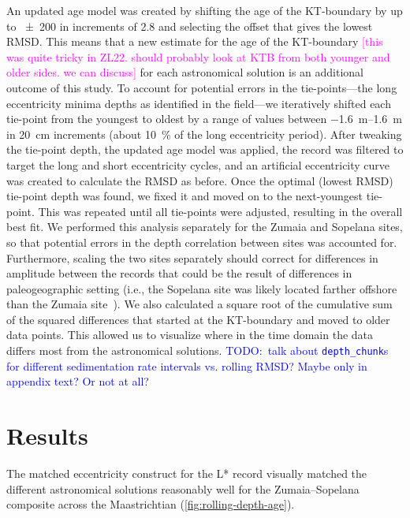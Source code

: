 \documentclass[draft]{agujournal2019}
\newcommand{\rez}{\textcolor{magenta}}
\newcommand{\ijk}{\textcolor{blue}}
\begin{document}
An updated age model was created by shifting the age of the \gls{KT}-boundary
by up to \qty{\pm200}{\kiloyear} in increments of \qty{2.8}{\kiloyear}
and selecting the offset that gives the lowest \gls{RMSD}.
This means that a new estimate for the age of the \gls{KT}-boundary
\rez{[this was quite tricky in ZL22. should probably look
at KTB from both younger and older sides. we can discuss]}
for each astronomical solution is an additional outcome of this study.
To account for potential errors in the tie-points---the long eccentricity minima depths as identified in the field---we iteratively shifted each tie-point from the youngest to oldest by a range of values between \qtyrange[range-phrase=~to~]{-1.6}{1.6}{\metre} in \qty{20}{\centi\metre} increments (about \qty{10}{\percent} of the long eccentricity period).
After tweaking the tie-point depth, the updated age model was applied, the record was filtered to target the long and short eccentricity cycles, and an artificial eccentricity curve was created to calculate the \gls{RMSD} as before.
Once the optimal (lowest \gls{RMSD}) tie-point depth was found, we fixed it and moved on to the next-youngest tie-point.
This was repeated until all tie-points were adjusted, resulting in the overall best fit.
We performed this analysis separately for the Zumaia and Sopelana sites, so that potential errors in the depth correlation between sites was accounted for.
Furthermore,  scaling the two sites separately should correct for differences in amplitude between the records that could be the result of differences in paleogeographic setting (i.e., the Sopelana site was likely located farther offshore than the Zumaia site~\cite{Batenburg2014}).
We also calculated a square root of the cumulative sum of the squared differences that started at the \gls{KT}-boundary and moved to older data points.
This allowed us to visualize where in the time domain the data differs most from the astronomical solutions.
\ijk{TODO:\ talk about \texttt{depth\_chunk}s for different sedimentation rate intervals vs. rolling RMSD? Maybe only in appendix text? Or not at all?}

\section{Results}\label{sec:results}

The matched eccentricity construct for the \gls{L*} record visually matched the different astronomical solutions reasonably well for the Zumaia--Sopelana composite across the Maastrichtian (\cref{fig:rolling-depth-age}). %
\end{document}

